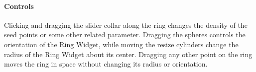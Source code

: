 \paragraph{Controls} Clicking and dragging the slider collar along the
ring changes the density of the seed points or some other related
parameter.  Dragging the spheres controls the orientation of the Ring
Widget, while moving the resize cylinders change the radius of the Ring
Widget about its center.  Dragging any other point on the ring moves the
ring in space without changing its radius or orientation.


